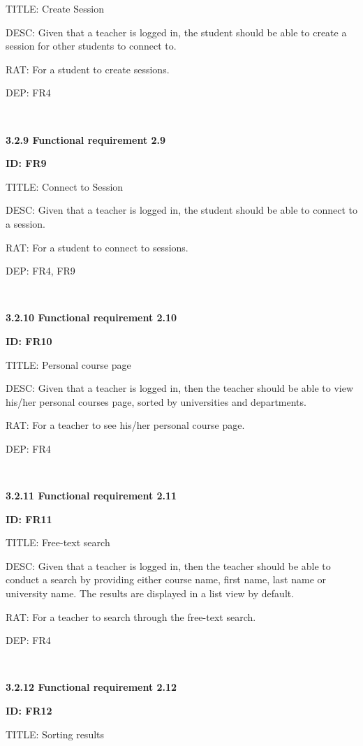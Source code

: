 \documentclass[12pt,a4paper]{article}
\begin{document}
\begin{flushleft}
        TITLE: Create Session

        DESC: Given that a teacher is logged in, the student should be able to create a session for other students to connect to.

        RAT: For a student to create sessions.

        DEP: FR4

        \

        \textbf{3.2.9 Functional requirement 2.9}

        \textbf{ID: FR9}

        TITLE: Connect to Session

        DESC: Given that a teacher is logged in, the student should be able to connect to a session.

        RAT: For a student to connect to sessions.

        DEP: FR4, FR9

        \

        \textbf{3.2.10 Functional requirement 2.10}

        \textbf{ID: FR10}

        TITLE: Personal course page

        DESC: Given that a teacher is logged in, then the teacher should be able
        to view his/her personal courses page, sorted by universities and
        departments.

        RAT: For a teacher to see his/her personal course page.

        DEP: FR4

        \

        \textbf{3.2.11 Functional requirement 2.11}

        \textbf{ID: FR11}

        TITLE: Free-text search

        DESC: Given that a teacher is logged in, then the teacher should be able
        to conduct a search by providing either course name, first name, last
        name or university name. The results are displayed in a list view by
        default.

        RAT: For a teacher to search through the free-text search.

        DEP: FR4

        \

        \textbf{3.2.12 Functional requirement 2.12}

        \textbf{ID: FR12}

        TITLE: Sorting results


\end{flushleft}
\end{document}
